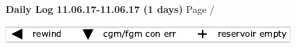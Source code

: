\noindent \large{\textbf{Daily Log 11.06.17-11.06.17 (1 days)}} \hfill \small{Page \thepage/\pageref{LastPage}}

\vspace{0.5em}
\centerline{\includegraphics{legendSymbols.pdf}}
\vspace{0.1em}